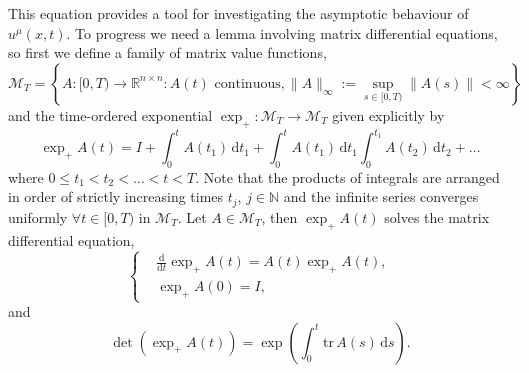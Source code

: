 \documentclass[a4paper,12pt,draft]{report}
\begin{document}
This equation provides a tool for investigating the asymptotic behaviour of $u^\mu(x, t)$.  To progress we need a lemma involving matrix differential equations, so first we define a family of matrix value functions,
$$
\mathcal{M}_T = \left\{ A: [0, T) \to \mathbb{R}^{n \times n} : A(t) \text{ continuous}, \|A\|_\infty := \sup_{s \in [0, T)} \|A(s)\| < \infty \right\}
$$
and the time-ordered exponential $\exp_+ : \mathcal{M}_T \to \mathcal{M}_T$ given explicitly by
$$
\exp_+ A(t) = I + \int_0^t A(t_1)\,\mathrm{d} t_1 + \int_0^t A(t_1)\,\mathrm{d} t_1 \int_0^{t_1} A(t_2)\,\mathrm{d} t_2 + \dots
$$
where $0 \le t_1 < t_2 < \dots < t < T$.  Note that the products of integrals are arranged in order of strictly increasing times $t_j$, $j\in \mathbb{N}$ and the infinite series converges uniformly $\forall t \in [0, T)$ in $\mathcal{M}_T$.
\lemma
{
Let $A \in \mathcal{M}_T$, then $\exp_+A(t)$ solves the matrix differential equation,
$$
\left\{
\begin{aligned}
& \frac{\mathrm{d}}{\mathrm{d}t}\exp_+A(t) = A(t)\exp_+A(t),\\
& \exp_+A(0) = I,
\end{aligned}
\right.
$$
and
$$
\det(\exp_+A(t)) = \exp \left( \int_0^t \mathrm{tr}\,A(s)\,\mathrm{d}s \right).
$$
}
\proof
\end{document}
